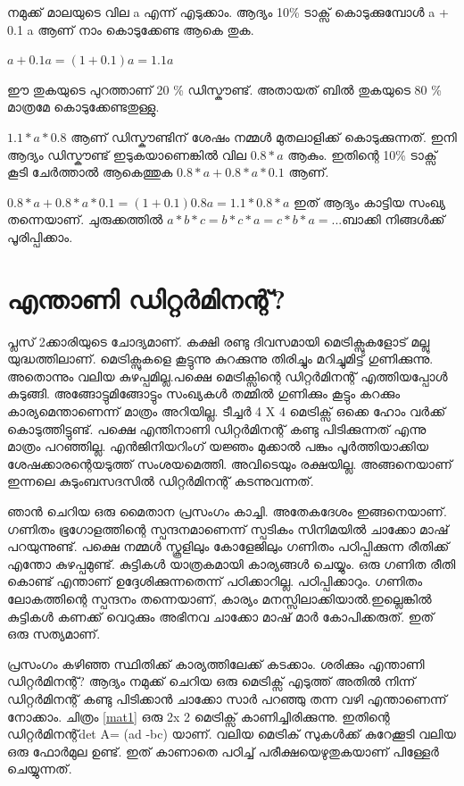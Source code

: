 \documentclass[10pt,a4paper]{report}
\begin{document}
  നമുക്ക് മാലയുടെ വില a എന്ന് എടുക്കാം. ആദ്യം 10\% ടാക്സ് കൊടുക്കുമ്പോൾ a + 0.1 a ആണ് നാം കൊടുക്കേണ്ട ആകെ തുക. 
  
 $ a+ 0. 1 a = (1 +0.1) a = 1.1 a$  
  
  ഈ തുകയുടെ പുറത്താണ് 20 \% ഡിസ്കൗണ്ട്. അതായത് ബിൽ തുകയുടെ 80 \% മാത്രമേ കൊടുക്കേണ്ടതുള്ളു. 
  
  $1.1 * a * 0.8 $ ആണ് ഡിസ്കൗണ്ടിന് ശേഷം നമ്മൾ മുതലാളിക്ക് കൊടുക്കുന്നത്. ഇനി ആദ്യം ഡിസ്കൗണ്ട് ഇടുകയാണെങ്കിൽ വില $0.8 * a$ ആകും. ഇതിന്റെ 10\% ടാക്സ് കൂടി ചേർത്താൽ ആകെത്തുക $0.8 *a + 0.8 * a * 0.1$ ആണ്. 
  
 $ 0.8 * a + 0.8 * a * 0.1 = (1 +0.1) 0.8 a = 1.1 * 0.8 * a$ ഇത് ആദ്യം കാട്ടിയ സംഖ്യ തന്നെയാണ്. ചുരുക്കത്തിൽ $a * b * c = b  * c * a = c * b * a  = ... $ബാക്കി നിങ്ങൾക്ക് പൂരിപ്പിക്കാം. 
\section{
 എന്താണി ഡിറ്റർമിനന്റ്?  }  
  പ്ലസ് 2ക്കാരിയുടെ ചോദ്യമാണ്. കക്ഷി രണ്ടു ദിവസമായി മെട്രിക്സുകളോട് മല്ലു യുദ്ധത്തിലാണ്. മെട്രിക്സുകളെ കൂട്ടുന്നു കുറക്കുന്നു തിരിച്ചും മറിച്ചുമിട്ട് ഗുണിക്കുന്നു. അതൊന്നും വലിയ കുഴപ്പമില്ല.പക്ഷെ മെട്രിക്സിന്റെ ഡിറ്റർമിനന്റ് എത്തിയപ്പോൾ കുടുങ്ങി. അങ്ങോട്ടുമിങ്ങോട്ടും സംഖ്യകൾ തമ്മിൽ ഗുണിക്കും കൂട്ടും കറക്കും കാര്യമെന്താണെന്ന് മാത്രം അറിയില്ല. ടീച്ചർ 4 X 4 മെട്രിക്സ് ഒക്കെ ഹോം വർക്ക് കൊടുത്തിട്ടുണ്ട്. പക്ഷെ എന്തിനാണി ഡിറ്റർമിനന്റ് കണ്ടു പിടിക്കുന്നത് എന്നു മാത്രം പറഞ്ഞില്ല. എൻജിനിയറിംഗ് യജ്ഞം മുക്കാൽ പങ്കും പൂർത്തിയാക്കിയ ശേഷക്കാരന്റെയടുത്ത് സംശയമെത്തി. അവിടെയും രക്ഷയില്ല. അങ്ങനെയാണ് ഇന്നലെ കുടുംബസദസിൽ ഡിറ്റർമിനന്റ് കടന്നുവന്നത്. 
  
  ഞാൻ ചെറിയ ഒരു മൈതാന പ്രസംഗം കാച്ചി. അതേകദേശം ഇങ്ങനെയാണ്. ഗണിതം ഭൂഗോളത്തിന്റെ സ്പന്ദനമാണെന്ന് സ്പടികം സിനിമയിൽ ചാക്കോ മാഷ് പറയുന്നുണ്ട്. പക്ഷെ നമ്മൾ സ്കൂളിലും കോളേജിലും ഗണിതം പഠിപ്പിക്കുന്ന രീതിക്ക് എന്തോ കുഴപ്പമുണ്ട്. കുട്ടികൾ യാത്രകമായി കാര്യങ്ങൾ ചെയ്യും. ഒരു ഗണിത രീതി കൊണ്ട് എന്താണ് ഉദ്ദേശിക്കുന്നതെന്ന് പഠിക്കാറില്ല. പഠിപ്പിക്കാറും. ഗണിതം ലോകത്തിന്റെ സ്പന്ദനം തന്നെയാണ്, കാര്യം മനസ്സിലാക്കിയാൽ.ഇല്ലെങ്കിൽ കുട്ടികൾ കണക്ക് വെറുക്കും അഭിനവ ചാക്കോ മാഷ് മാർ കോപിക്കരുത്. ഇത് ഒരു സത്യമാണ്. 
  
  പ്രസംഗം കഴിഞ്ഞ സ്ഥിതിക്ക് കാര്യത്തിലേക്ക് കടക്കാം. ശരിക്കും എന്താണി ഡിറ്റർമിനന്റ്? ആദ്യം നമുക്ക് ചെറിയ ഒരു മെട്രിക്സ് എടുത്ത് അതിൽ നിന്ന് ഡിറ്റർമിനന്റ് കണ്ടു പിടിക്കാൻ ചാക്കോ സാർ പറഞ്ഞു തന്ന വഴി എന്താണെന്ന് നോക്കാം. ചിത്രം \ref{mat1} ഒരു 2x 2 മെട്രിക്സ് കാണിച്ചിരിക്കുന്നു. ഇതിന്റെ ഡിറ്റർമിനന്റ്det A= (ad -bc) യാണ്. വലിയ മെട്രിക് സുകൾക്ക് കുറേക്കൂടി വലിയ ഒരു ഫോർമുല ഉണ്ട്. ഇത് കാണാതെ പഠിച്ച് പരീക്ഷയെഴുതുകയാണ് പിള്ളേർ ചെയ്യുന്നത്.
  
\end{document}
